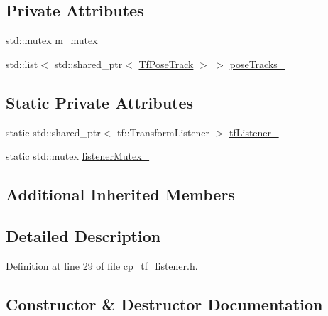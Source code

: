 \subsection*{Private Attributes}
\begin{DoxyCompactItemize}
\item 
std\+::mutex \hyperlink{classcl__move__base__z_1_1CpTFListener_adf87e22c71f56e64622e7046bcf68ffe}{m\+\_\+mutex\+\_\+}
\item 
std\+::list$<$ std\+::shared\+\_\+ptr$<$ \hyperlink{structcl__move__base__z_1_1TfPoseTrack}{Tf\+Pose\+Track} $>$ $>$ \hyperlink{classcl__move__base__z_1_1CpTFListener_a22555065516af0d20ea11d72dc4daa9b}{pose\+Tracks\+\_\+}
\end{DoxyCompactItemize}
\subsection*{Static Private Attributes}
\begin{DoxyCompactItemize}
\item 
static std\+::shared\+\_\+ptr$<$ tf\+::\+Transform\+Listener $>$ \hyperlink{classcl__move__base__z_1_1CpTFListener_a9a01782f5bd1ef2751b8044b2b5b3285}{tf\+Listener\+\_\+}
\item 
static std\+::mutex \hyperlink{classcl__move__base__z_1_1CpTFListener_aaf49a2f8524426920ae22fbc692a853d}{listener\+Mutex\+\_\+}
\end{DoxyCompactItemize}
\subsection*{Additional Inherited Members}


\subsection{Detailed Description}


Definition at line 29 of file cp\+\_\+tf\+\_\+listener.\+h.



\subsection{Constructor \& Destructor Documentation}
\mbox{\label{classcl__move__base__z_1_1CpTFListener_a4379d3a0b3d67ffbb0741688bf39dda5}} 
